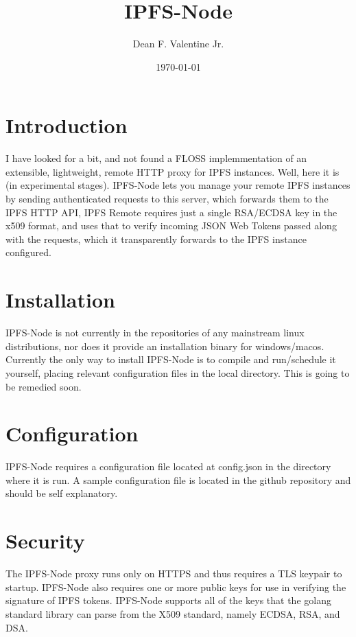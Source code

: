 \documentclass{article}
\title{IPFS-Node}
\author{Dean F. Valentine Jr.}
\date{\today}
\begin{document}
\maketitle

\section{Introduction}

I have looked for a bit, and not found a FLOSS implemmentation of an extensible,
lightweight, remote HTTP proxy for IPFS instances. Well, here it is (in
experimental stages).  IPFS-Node lets you manage your remote IPFS instances by
sending authenticated requests to this server, which forwards them to the IPFS
HTTP API, IPFS Remote requires just a single RSA/ECDSA key in the x509 format,
and uses that to verify incoming JSON Web Tokens passed along with the requests,
which it transparently forwards to the IPFS instance configured.

\section{Installation}

IPFS-Node is not currently in the repositories of any mainstream linux
distributions, nor does it provide an installation binary for windows/macos.
Currently the only way to install IPFS-Node is to compile and run/schedule it
yourself, placing relevant configuration files in the local directory. This is
going to be remedied soon.

\section{Configuration}

IPFS-Node requires a configuration file located at config.json in the directory
where it is run. A sample configuration file is located in the github
repository and should be self explanatory.

\section{Security}

The IPFS-Node proxy runs only on HTTPS and thus requires a TLS keypair to
startup. IPFS-Node also requires one or more public keys for use in verifying
the signature of IPFS tokens. IPFS-Node supports all of the keys that the
golang standard library can parse from the X509 standard, namely ECDSA, RSA,
and DSA.
\end{document}
